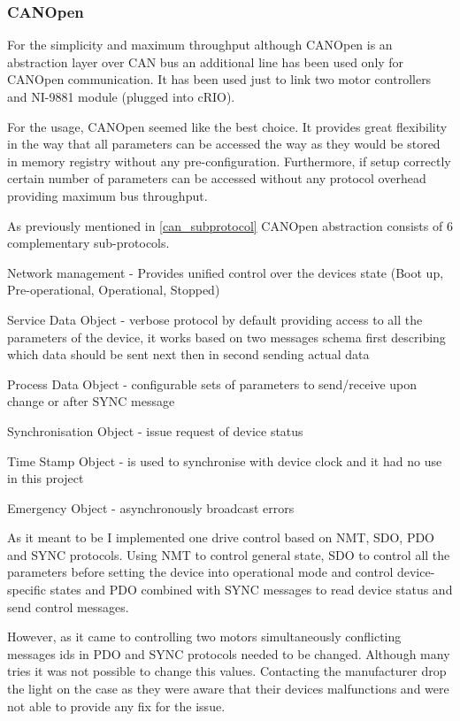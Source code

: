 \subsubsection{CANOpen}
For the simplicity and maximum throughput although CANOpen is an abstraction layer over CAN bus an additional line has been used only for CANOpen communication. It has been used just to link two motor controllers and NI-9881 module (plugged into cRIO).

For the usage, CANOpen seemed like the best choice. It provides great flexibility in the way that all parameters can be accessed the way as they would be stored in memory registry without any pre-configuration. Furthermore, if setup correctly certain number of parameters can be accessed without any protocol overhead providing maximum bus throughput.

As previously mentioned in \ref{can_subprotocol} CANOpen abstraction consists of 6 complementary sub-protocols.
\begin{description}[labelindent=1cm]
    \item[NMT] Network management - Provides unified control over the devices state (Boot up, Pre-operational, Operational, Stopped)
    \item[SDO] Service Data Object - verbose protocol by default providing access to all the parameters of the device, it works based on two messages schema first describing which data should be sent next then in second sending actual data
    \item[PDO] Process Data Object - configurable sets of parameters to send/receive upon change or after SYNC message
    \item[SYNC]    Synchronisation Object - issue request of device status
    \item[TIME]    Time Stamp Object - is used to synchronise with device clock and it had no use in this project
    \item[EMCY] Emergency Object - asynchronously broadcast errors
\end{description}

As it meant to be I implemented one drive control based on NMT, SDO, PDO and SYNC protocols. Using NMT to control general state, SDO to control all the parameters before setting the device into operational mode and control device-specific states and PDO combined with SYNC messages to read device status and send control messages.

However, as it came to controlling two motors simultaneously conflicting messages ids in PDO and SYNC protocols needed to be changed. Although many tries it was not possible to change this values. Contacting the manufacturer drop the light on the case as they were aware that their devices malfunctions and were not able to provide any fix for the issue.

